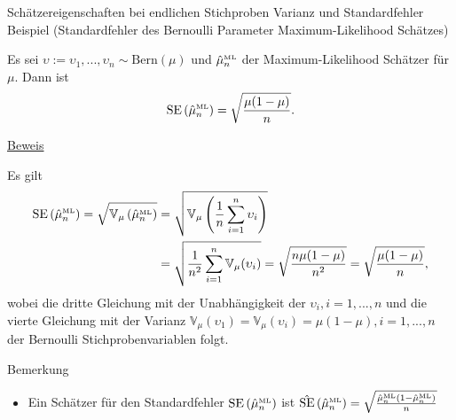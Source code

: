 \documentclass[
  8pt,
  ignorenonframetext,
]{beamer}
\providecommand{\tightlist}{%
  \setlength{\itemsep}{0pt}\setlength{\parskip}{0pt}}
\newcommand{\ups} {\upsilon}
\begin{document}
\begin{frame}{\small Schätzereigenschaften bei endlichen Stichproben
\textbar{} Varianz und Standardfehler}
\protect\hypertarget{schuxe4tzereigenschaften-bei-endlichen-stichproben-varianz-und-standardfehler-2}{}
Beispiel (Standardfehler des Bernoulli Parameter Maximum-Likelihood
Schätzes)

\small

Es sei \(\ups := \ups_1,...,\ups_n \sim \mbox{Bern}(\mu)\) und
\(\hat{\mu}^{\mbox{\tiny ML}}_n\) der Maximum-Likelihood Schätzer für
\(\mu\). Dann ist \begin{equation}
\mbox{SE}\left(\hat{\mu}^{\mbox{\tiny ML}}_n\right) = \sqrt{\frac{\mu(1-\mu)}{n}}.
\end{equation}

\footnotesize

\underline{Beweis}

Es gilt \tiny \begin{align}
\begin{split}
\mbox{SE}\left(\hat{\mu}^{\mbox{\tiny ML}}_n\right)
= \sqrt{\mathbb{V}_\mu\left(\hat{\mu}^{\mbox{\tiny ML}}_n\right)}
& = \sqrt{\mathbb{V}_\mu\left(\frac{1}{n}\sum_{i=1}^n \ups_i \right)} \\
& = \sqrt{\frac{1}{n^2}\sum_{i=1}^n \mathbb{V}_\mu(\ups_i)}
= \sqrt{\frac{n \mu(1-\mu)}{n^2}}
= \sqrt{\frac{\mu(1-\mu)}{n}},
\end{split}
\end{align} \footnotesize wobei die dritte Gleichung mit der
Unabhängigkeit der \(\ups_i, i = 1,...,n\) und die vierte Gleichung mit
der Varianz
\(\mathbb{V}_\mu(\ups_1) = \mathbb{V}_\mu(\ups_i) = \mu(1-\mu), i = 1,...,n\)
der Bernoulli Stichprobenvariablen folgt.

\footnotesize

Bemerkung \vspace{-1mm}

\begin{itemize}
\tightlist
\item
  Ein Schätzer für den Standardfehler
  \(\mbox{SE}\left(\hat{\mu}^{\mbox{\tiny ML}}_n\right)\) ist
  \(\hat{\mbox{SE}}\left(\hat{\mu}^{\mbox{\tiny ML}}_n\right) = \sqrt{\frac{\hat{\mu}^{\mbox{\tiny ML}}_n(1-\hat{\mu}^{\mbox{\tiny ML}}_n)}{n}}\)
\end{itemize}
\end{frame}
\end{document}
